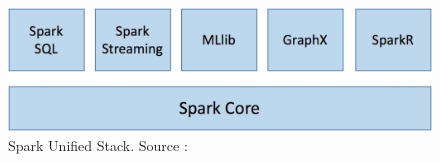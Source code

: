 \begin{figure}[H]
	\centering
	\includegraphics[width=0.7\linewidth]{illustrations/unified-stack}
	\caption{ Spark Unified Stack. Source : \cite{eginning-Apache-Spark-2-unified-stack}}
	\label{fig:unified-stack}
\end{figure}

